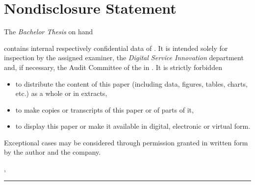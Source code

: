 
\clearpage

\chapter*{Nondisclosure Statement}
\thispagestyle{scrheadings}

The \textit{Bachelor Thesis} on hand
\begin{center}{\itshape{} \thetitle\/}\end{center}
contains internal respectively confidential data of \textit{\thecompany}. It is intended solely for inspection by the assigned examiner, the \textit{Digital Service Innovation} department and, if necessary, the Audit Committee of the \theuniversity in \theplace. It is strictly forbidden
\begin{itemize}
    \item to distribute the content of this paper (including data, figures, tables, charts, etc.) as a whole or in extracts,
    \item to make copies or transcripts of this paper or of parts of it,
    \item to display this paper or make it available in digital, electronic or virtual form.
\end{itemize}
Exceptional cases may be considered through permission granted in written form by the author and the company.

\vspace{3em}

\theplace, \thedate
\vspace{4em}

\rule{6cm}{0.4pt}\\
\theauthor